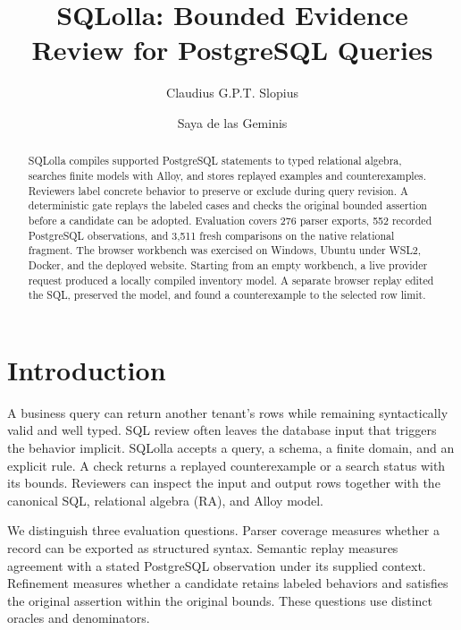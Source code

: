 \documentclass[sigconf,nonacm]{acmart}
\begin{document}
\title{SQLolla: Bounded Evidence Review for PostgreSQL Queries}
\author{Claudius G.P.T. Slopius}
\author{Saya de las Geminis}

\begin{abstract}
SQLolla compiles supported PostgreSQL statements to typed relational algebra, searches finite models with Alloy, and stores replayed examples and counterexamples. Reviewers label concrete behavior to preserve or exclude during query revision. A deterministic gate replays the labeled cases and checks the original bounded assertion before a candidate can be adopted. Evaluation covers 276 parser exports, 552 recorded PostgreSQL observations, and 3,511 fresh comparisons on the native relational fragment. The browser workbench was exercised on Windows, Ubuntu under WSL2, Docker, and the deployed website. Starting from an empty workbench, a live provider request produced a locally compiled inventory model. A separate browser replay edited the SQL, preserved the model, and found a counterexample to the selected row limit.
\end{abstract}

\maketitle

\section{Introduction}
A business query can return another tenant's rows while remaining syntactically valid and well typed. SQL review often leaves the database input that triggers the behavior implicit. SQLolla accepts a query, a schema, a finite domain, and an explicit rule. A check returns a replayed counterexample or a search status with its bounds. Reviewers can inspect the input and output rows together with the canonical SQL, relational algebra (RA), and Alloy model.

We distinguish three evaluation questions. Parser coverage measures whether a record can be exported as structured syntax. Semantic replay measures agreement with a stated PostgreSQL observation under its supplied context. Refinement measures whether a candidate retains labeled behaviors and satisfies the original assertion within the original bounds. These questions use distinct oracles and denominators.
\end{document}
